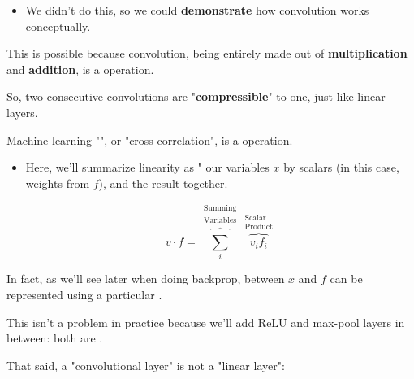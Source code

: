        \begin{itemize}
            \item We didn't do this, so we could \textbf{demonstrate} how convolution works conceptually.
        \end{itemize}

        This is possible because convolution, being entirely made out of \textbf{multiplication} and \textbf{addition}, is a  operation.

        So, two consecutive convolutions are "\textbf{compressible}" to one, just like linear layers.\\

        \begin{concept}
            Machine learning "", or "cross-correlation", is a  operation.

            \begin{itemize}
                \item Here, we'll summarize linearity as " our variables $x$ by scalars (in this case, weights from $f$), and  the result together.

                \begin{equation*}
                    v \cdot f = \overbrace{\sum_i}
                    ^{\begin{matrix}
                        \text{Summing} \\ \text{Variables}
                    \end{matrix}} 
                    \overbrace{v_if_i}
                    ^{\begin{matrix}
                        \text{Scalar} \\ \text{Product}
                    \end{matrix}}
                \end{equation*}
            \end{itemize}

            In fact, as we'll see later when doing backprop,  between $x$ and $f$ can be represented using a particular .
        \end{concept}

        This isn't a problem in practice because we'll add ReLU and max-pool layers in between: both are .

        That said, a "convolutional layer" is not a "linear layer":\\

